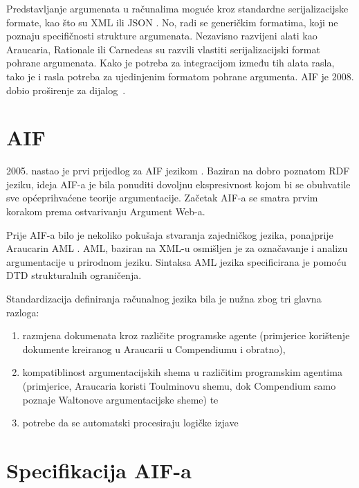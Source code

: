 Predstavljanje argumenata u računalima moguće kroz standardne 
serijalizacijske formate, kao što su
XML  ili JSON . 
No, radi se generičkim formatima, koji ne poznaju specifičnosti 
strukture argumenata. Nezavisno razvijeni alati kao Araucaria, Rationale 
ili Carnedeas su razvili vlastiti serijalizacijski format pohrane
argumenata. Kako je potreba za integracijom između tih alata rasla, tako
je i rasla potreba za ujedinjenim formatom pohrane argumenta. 
AIF je 2008. dobio proširenje za dijalog~\citep{reed2008aif+}.

\section{AIF}

2005. nastao je prvi prijedlog za AIF  jezikom \citep{chesnevar2006towards}. 
Baziran na dobro poznatom RDF jeziku, ideja AIF-a
je bila ponuditi dovoljnu ekspresivnost kojom bi se obuhvatile sve
općeprihvaćene teorije argumentacije. Začetak AIF-a se smatra prvim korakom
prema ostvarivanju Argument Web-a. 

Prije AIF-a bilo je nekoliko pokušaja stvaranja zajedničkog jezika, ponajprije
Araucarin AML . AML, baziran na XML-u
 osmišljen je za označavanje i analizu
argumentacije u prirodnom jeziku. Sintaksa AML jezika specificirana je pomoću
DTD  strukturalnih ograničenja.  

Standardizacija definiranja računalnog jezika bila je nužna zbog tri glavna razloga:
\begin{enumerate}
    \item razmjena dokumenata kroz različite programske agente (primjerice 
korištenje dokumente kreiranog u Araucarii u Compendiumu i obratno), 
    \item kompatiblinost argumentacijskih shema u različitim programskim agentima
(primjerice, Araucaria koristi Toulminovu shemu, dok Compendium samo poznaje 
Waltonove argumentacijske sheme) te 
    \item potrebe da se automatski procesiraju logičke izjave
\end{enumerate}

\section{Specifikacija AIF-a}


